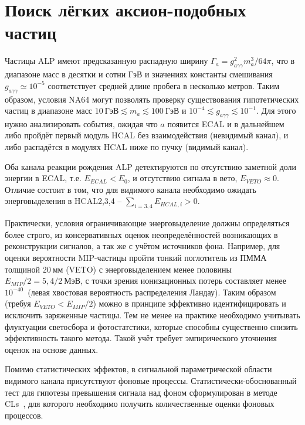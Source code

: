 \section{Поиск лёгких аксион-подобных частиц}

Частицы ALP имеют предсказанную распадную ширину
$\Gamma_{a} = g^2_{a\gamma\gamma} m_a^3 / 64 \pi$, что
в диапазоне масс в десятки и сотни ГэВ и значениях константы
смешивания $g_{a\gamma\gamma} \simeq10^{-5}$ соответствует
средней длине пробега в несколько метров. Таким образом,
условия NA64 могут позволять проверку существования гипотетических
частиц в диапазоне масс $10~\text{ГэВ} \lesssim m_a \lesssim 100~\text{ГэВ}$
и $10^{-4}\lesssim g_{a\gamma\gamma} \lesssim10^{-1}$.
Для этого нужно анализировать события, ожидая что
$a$ появится ECAL и в дальнейшем либо пройдёт первый модуль HCAL без
взаимодействия (невидимый канал), и либо распадётся в модулях HCAL ниже
по пучку (видимый канал).

Оба канала реакции рождения ALP детектируются по
отсутствию заметной доли энергии в ECAL, т.е. $E_{ECAL} < E_0$,
и отсутствию сигнала в вето, $E_{VETO} \approx 0$. Отличие состоит
в том, что для видимого канала необходимо ожидать энерговыделения
в HCAL2,3,4 -- $\sum\limits_{i = 3,4} E_{HCAL,i} > 0$.

Практически, условия ограничивающие энерговыделение должны определяться более
строго, из консервативных оценок неопределённостей возникающих
в реконструкции сигналов, а так же с учётом источников фона.
Например, для оценки вероятности MIP-частицы пройти тонкий
поглотитель из ПММА толщиной $20~\text{мм}$ (VETO) с энерговыделением
менее половины $E_{MIP}/2 = 5{,}4/2~\text{МэВ}$, с точки зрения ионизационных
потерь составляет менее $10^{-40}$~(левая хвостовая вероятность распределения
Ландау). Таким образом (требуя $E_{VETO} < E_{MIP}/2$) можно в принципе
эффективно идентифицировать и исключить заряженные частицы. Тем не менее
на практике необходимо учитывать флуктуации светосбора и фотостатстики,
которые способны существенно снизить эффективность такого метода.
Такой учёт требует эмпирического уточнения оценок на основе данных.

Помимо статистических эффектов, в сигнальной параметрической области
видимого канала присутствуют фоновые процессы. Статистически-обоснованный
тест для гипотезы превышения сигнала над фоном сформулирован в методе
CLs~\cite{read-cls}, для которого необходимо получить количественные
оценки фоновых процессов.


